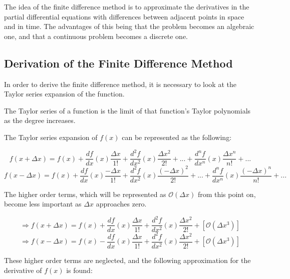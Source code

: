 The idea of the finite difference method is to approximate the derivatives in the partial differential equations with differences between adjacent points in space and in time. The advantages of this being that the problem becomes an algebraic one, and that a continuous problem becomes a discrete one.

\subsection{Derivation of the Finite Difference Method}

In order to derive the finite difference method, it is necessary to look at the Taylor series expansion of the function.

\begin{definition}
The Taylor series of a function is the limit of that function's Taylor polynomials as the degree increases.
\end{definition}

The Taylor series expansion of $f(x)$ can be represented as the following:

\begin{equation}
    f(x + \Delta x) = f(x) + \frac{d f}{d x}(x) \frac{\Delta x}{1!} + \frac{d^2 f}{d x^2}(x) \frac{\Delta x^2}{2!} + ... + \frac{d^n f}{d x^n}(x) \frac{\Delta x^n}{n!} + ...
\end{equation}
\begin{equation}
    f(x - \Delta x) = f(x) + \frac{d f}{d x}(x) \frac{-\Delta x}{1!} + \frac{d^2 f}{d x^2}(x) \frac{(-\Delta x)^2}{2!} + ... + \frac{d^n f}{d x^n}(x) \frac{(-\Delta x)^n}{n!} + ...
\end{equation}

The higher order terms, which will be represented as $\mathcal{O}(\Delta x)$ from this point on, become less important as $\Delta x$ approaches zero.

\begin{equation}
    \Rightarrow f(x + \Delta x) = f(x) + \frac{d f}{d x}(x) \frac{\Delta x}{1!} + \frac{d^2 f}{d x^2}(x) \frac{\Delta x^2}{2!} + [\mathcal{O}(\Delta x^3)] 
    \label{fds}
\end{equation}
\begin{equation}
    \Rightarrow f(x - \Delta x) = f(x) - \frac{d f}{d x}(x) \frac{\Delta x}{1!} + \frac{d^2 f}{d x^2}(x) \frac{\Delta x^2}{2!} + [\mathcal{O}(\Delta x^3)]
    \label{bds}
\end{equation}

These higher order terms are neglected, and the following approximation for the derivative of $f(x)$ is found:

